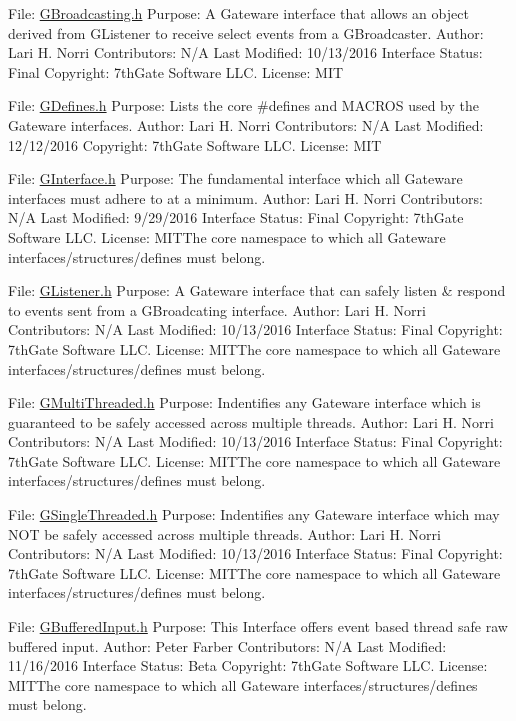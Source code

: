 File\+: \hyperlink{GBroadcasting_8h_source}{G\+Broadcasting.\+h} Purpose\+: A Gateware interface that allows an object derived from G\+Listener to receive select events from a G\+Broadcaster. Author\+: Lari H. Norri Contributors\+: N/A Last Modified\+: 10/13/2016 Interface Status\+: Final Copyright\+: 7th\+Gate Software L\+LC. License\+: M\+IT

File\+: \hyperlink{GDefines_8h_source}{G\+Defines.\+h} Purpose\+: Lists the core \#defines and M\+A\+C\+R\+OS used by the Gateware interfaces. Author\+: Lari H. Norri Contributors\+: N/A Last Modified\+: 12/12/2016 Copyright\+: 7th\+Gate Software L\+LC. License\+: M\+IT

File\+: \hyperlink{GInterface_8h_source}{G\+Interface.\+h} Purpose\+: The fundamental interface which all Gateware interfaces must adhere to at a minimum. Author\+: Lari H. Norri Contributors\+: N/A Last Modified\+: 9/29/2016 Interface Status\+: Final Copyright\+: 7th\+Gate Software L\+LC. License\+: M\+I\+T\+The core namespace to which all Gateware interfaces/structures/defines must belong.

File\+: \hyperlink{GListener_8h_source}{G\+Listener.\+h} Purpose\+: A Gateware interface that can safely listen \& respond to events sent from a G\+Broadcating interface. Author\+: Lari H. Norri Contributors\+: N/A Last Modified\+: 10/13/2016 Interface Status\+: Final Copyright\+: 7th\+Gate Software L\+LC. License\+: M\+I\+T\+The core namespace to which all Gateware interfaces/structures/defines must belong.

File\+: \hyperlink{GMultiThreaded_8h_source}{G\+Multi\+Threaded.\+h} Purpose\+: Indentifies any Gateware interface which is guaranteed to be safely accessed across multiple threads. Author\+: Lari H. Norri Contributors\+: N/A Last Modified\+: 10/13/2016 Interface Status\+: Final Copyright\+: 7th\+Gate Software L\+LC. License\+: M\+I\+T\+The core namespace to which all Gateware interfaces/structures/defines must belong.

File\+: \hyperlink{GSingleThreaded_8h_source}{G\+Single\+Threaded.\+h} Purpose\+: Indentifies any Gateware interface which may N\+OT be safely accessed across multiple threads. Author\+: Lari H. Norri Contributors\+: N/A Last Modified\+: 10/13/2016 Interface Status\+: Final Copyright\+: 7th\+Gate Software L\+LC. License\+: M\+I\+T\+The core namespace to which all Gateware interfaces/structures/defines must belong.

File\+: \hyperlink{GBufferedInput_8h_source}{G\+Buffered\+Input.\+h} Purpose\+: This Interface offers event based thread safe raw buffered input. Author\+: Peter Farber Contributors\+: N/A Last Modified\+: 11/16/2016 Interface Status\+: Beta Copyright\+: 7th\+Gate Software L\+LC. License\+: M\+I\+T\+The core namespace to which all Gateware interfaces/structures/defines must belong.

